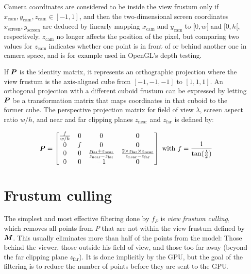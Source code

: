 \documentclass[a4paper,10pt,abstracton,notitlepage]{scrreprt}
\begin{document}
Camera coordinates are considered to be inside the view frustum only if $x_{\mathrm{cam}}, y_{\mathrm{cam}}, z_{\mathrm{cam}} \in [-1, 1]$, and then the two-dimensional screen coordinates $x_{\mathrm{screen}}, y_{\mathrm{screen}}$ are deduced by linearly mapping $x_{\mathrm{cam}}$ and $y_{\mathrm{cam}}$ to $[0, w[$ and $[0, h[$, respectively. $z_{\mathrm{cam}}$ no longer affects the position of the pixel, but comparing two values for $z_{\mathrm{cam}}$ indicates whether one point is in front of or behind another one in camera space, and is for example used in OpenGL's depth testing.

If $\matrixsym{P}$ is the identity matrix, it represents an orthographic projection where the view frustum is the axis-aligned cube from $[-1, -1, -1]$ to $[1, 1, 1]$. An orthogonal projection with a different cuboid frustum can be expressed by letting $\matrixsym{P}$ be a transformation matrix that maps coordinates in that cuboid to the former cube. The perspective projection matrix for field of view $\lambda$, screen aspect ratio $w/h$, and near and far clipping planes $z_{\mathrm{near}}$ and $z_{\mathrm{far}}$ is defined by:

\begin{displaymath}
\matrixsym{P} = \begin{bmatrix}
\frac{f}{w/h} & 0 & 0 & 0 \\
0 & f & 0 & 0 \\
0 & 0 & \frac{z_{\mathrm{far}} + z_{\mathrm{near}}}{z_{\mathrm{near}} - z_{\mathrm{far}}} & \frac{2 \times z_{\mathrm{far}} \times z_{\mathrm{near}}}{z_{\mathrm{near}} - z_{\mathrm{far}}} \\
0 & 0 & -1 & 0
\end{bmatrix}
\text{ with }
f = \frac{1}{\tan(\frac{\lambda}{2})}
\end{displaymath}


\section{Frustum culling}
The simplest and most effective filtering done by $f_{P}$ is \emph{view frustum culling}, which removes all points from $P$ that are not within the view frustum defined by $\matrixsym{M}$. This usually eliminates more than half of the points from the model: Those behind the viewer, those outside his field of view, and those too far away (beyond the far clipping plane $z_{\mathrm{far}}$). It is done implicitly by the GPU, but the goal of the filtering is to reduce the number of points before they are sent to the GPU.
\end{document}
